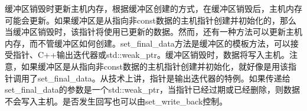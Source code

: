 缓冲区销毁时更新主机内存，根据缓冲区创建的方式，在缓冲区销毁后，主机内存可能会更新。如果缓冲区是从指向非const数据的主机指针创建并初始化的，那么当缓冲区销毁时，该指针将使用已更新的数据。然而，还有一种方法可以更新主机内存，而不管缓冲区如何创建。set\_final\_data方法是缓冲区的模板方法，可以接受指针、C++输出迭代器或std::weak\_ptr。缓冲区销毁时，数据将写入主机。注意，如果缓冲区是从指向非const数据的主机指针创建并初始化，就好像是用该指针调用了set\_final\_data。从技术上讲，指针是输出迭代器的特例。如果传递给set\_final\_data的参数是一个std::weak\_ptr，当指针已经过期或已经删除，则数据不会写入主机。是否发生回写也可以由set\_write\_back控制。\par





























